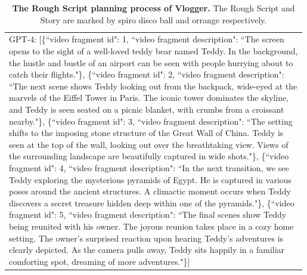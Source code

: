 \begin{table}[h!]
\begin{minipage}{0.98\linewidth}
\begin{tcolorbox}
\begin{tabular}{p{0.99\linewidth}}
\begin{minipage}{0.99\linewidth}
GPT-4: \textcolor[RGB]{37, 204, 247}{[\{``video fragment id": 1, ``video fragment description": ``The screen opens to the sight of a well-loved teddy bear named Teddy. In the background, the hustle and bustle of an airport can be seen with people hurrying about to catch their flights."\}, \{``video fragment id": 2, ``video fragment description": ``The next scene shows Teddy looking out from the backpack, wide-eyed at the marvels of the Eiffel Tower in Paris. The iconic tower dominates the skyline, and Teddy is seen seated on a picnic blanket, with crumbs from a croissant nearby."\}, \{``video fragment id": 3, ``video fragment description": ``The setting shifts to the imposing stone structure of the Great Wall of China. Teddy is seen at the top of the wall, looking out over the breathtaking view. Views of the surrounding landscape are beautifully captured in wide shots."\}, \{``video fragment id": 4, ``video fragment description": ``In the next transition, we see Teddy exploring the mysterious pyramids of Egypt. He is captured in various poses around the ancient structures. A climactic moment occurs when Teddy discovers a secret treasure hidden deep within one of the pyramids."\}, \{``video fragment id": 5, ``video fragment description": ``The final scenes show Teddy being reunited with his owner. The joyous reunion takes place in a cozy home setting. The owner's surprised reaction upon hearing Teddy's adventures is clearly depicted. As the camera pulls away, Teddy sits happily in a familiar comforting spot, dreaming of more adventures."\}]
}
 \end{minipage}
        \end{tabular}
    \end{tcolorbox}
    \vspace{-2mm}
    \caption{\textbf{The Rough Script planning process of Vlogger.} The \textcolor[RGB]{37, 204, 247}{Rough Script} and \textcolor[RGB]{243, 156, 18}{Story} are marked by \textcolor[RGB]{37, 204, 247}{spiro disco ball} and \textcolor[RGB]{243, 156, 18}{orrange} respectively.
    }
    \label{tab:instruction_1}
\end{minipage}
\end{table}